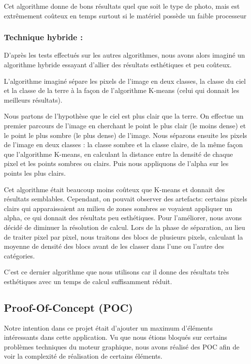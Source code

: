 \documentclass{report}
\begin{document}
Cet algorithme donne de bons résultats quel que soit le type de photo,
mais est extrêmement coûteux en temps surtout si le matériel possède un
faible processeur

\subsubsection{Technique hybride :}

D’après les tests effectués sur les autres algorithmes, nous avons alors
imaginé un algorithme hybride essayant d’allier des résultats esthétiques
et peu coûteux.
\bigskip

L’algorithme imaginé sépare les pixels de l’image en deux classes, la
classe du ciel et la classe de la terre à la façon de l’algorithme
K-means (celui qui donnait les meilleurs résultats).

Nous partons de
l’hypothèse que le ciel est plus clair que la terre. On effectue un
premier parcours de l’image en cherchant le point le plus clair (le
moins dense) et le point le plus sombre (le plus dense) de l’image. Nous
séparons ensuite les pixels de l’image en deux classes : la classe
sombre et la classe claire, de la même façon que l’algorithme K-means,
en calculant la distance entre la densité de chaque pixel et les points
sombres ou clairs. Puis nous appliquons de l’alpha sur les points les plus clairs.
\bigskip

Cet algorithme était beaucoup moins coûteux que K-means et donnait des
résultats semblables. Cependant, on pouvait observer des
artefacts: certains pixels clairs qui
apparaissaient au milieu de zones sombres se voyaient appliquer un
alpha, ce qui donnait des résultats peu esthétiques. Pour l’améliorer,
nous avons décidé de diminuer la résolution de calcul. Lors de la phase
de séparation, au lieu de traiter pixel par pixel, nous traitons des
blocs de plusieurs pixels, calculant la moyenne de densité des blocs
avant de les classer dans l’une ou l’autre des catégories.
\bigskip

C’est ce dernier algorithme que nous utilisons car il donne des
résultats très esthétiques avec un temps de calcul suffisamment réduit.

\subsection{Proof-Of-Concept (POC)}
\bigskip


Notre intention dans ce projet était d’ajouter un maximum d'éléments
intéressants dans cette application. Vu que nous étions bloqués sur
certains problèmes techniques du moteur graphique, nous avons réalisé
des POC afin de voir la complexité de réalisation de certains éléments.
\end{document}
